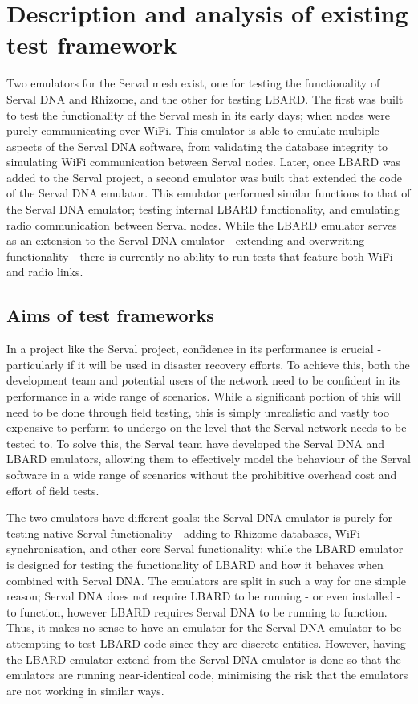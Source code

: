 \chapter{Description and analysis of existing test framework} 
\label{Chapter3} 

Two emulators for the Serval mesh exist, one for testing the functionality of Serval DNA and Rhizome, and the other for testing LBARD. 
The first was built to test the functionality of the Serval mesh in its early days; when nodes were purely communicating over WiFi. 
This emulator is able to emulate multiple aspects of the Serval DNA software, from validating the database integrity to simulating WiFi communication between Serval nodes. 
Later, once LBARD was added to the Serval project, a second emulator was built that extended the code of the Serval DNA emulator.
This emulator performed similar functions to that of the Serval DNA emulator; testing internal LBARD functionality, and emulating radio communication between Serval nodes. 
While the LBARD emulator serves as an extension to the Serval DNA emulator - extending and overwriting functionality - there is currently no ability to run tests that feature both WiFi and radio links. 


\section{Aims of test frameworks}
In a project like the Serval project, confidence in its performance is crucial - particularly if it will be used in disaster recovery efforts.
To achieve this, both the development team and potential users of the network need to be confident in its performance in a wide range of scenarios. 
While a significant portion of this will need to be done through field testing, this is simply unrealistic and vastly too expensive to perform to undergo on the level that the Serval network needs to be tested to.
To solve this, the Serval team have developed the Serval DNA and LBARD emulators, allowing them to effectively model the behaviour of the Serval software in a wide range of scenarios without the prohibitive overhead cost and effort of field tests.

The two emulators have different goals: the Serval DNA emulator is purely for testing native Serval functionality - adding to Rhizome databases, WiFi synchronisation, and other core Serval functionality; while the LBARD emulator is designed for testing the functionality of LBARD and how it behaves when combined with Serval DNA.
The emulators are split in such a way for one simple reason; Serval DNA does not require LBARD to be running - or even installed - to function, however LBARD requires Serval DNA to be running to function.
Thus, it makes no sense to have an emulator for the Serval DNA emulator to be attempting to test LBARD code since they are discrete entities.
However, having the LBARD emulator extend from the Serval DNA emulator is done so that the emulators are running near-identical code, minimising the risk that the emulators are not working in similar ways.



